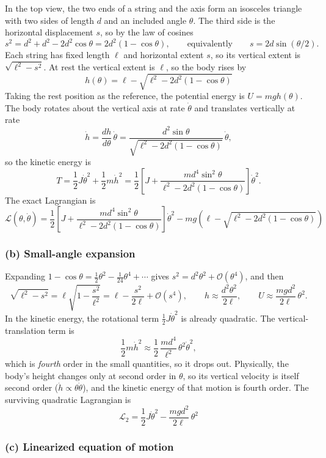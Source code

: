 \documentclass[11pt,letterpaper]{article}
\begin{document}
In the top view, the two ends of a string and the axis form an isosceles triangle with two sides of length $d$ and an included angle $\theta$. The third side is the horizontal displacement $s$, so by the law of cosines
\[
s^2 = d^2 + d^2 - 2d^2\cos\theta = 2d^2(1-\cos\theta),
\qquad\text{equivalently}\qquad
s = 2d\sin(\theta/2).
\]
Each string has fixed length $\ell$ and horizontal extent $s$, so its vertical extent is $\sqrt{\ell^2 - s^2}$. At rest the vertical extent is $\ell$, so the body rises by
\[
\boxed{h(\theta) = \ell - \sqrt{\ell^2 - 2d^2(1-\cos\theta)}}
\]
Taking the rest position as the reference, the potential energy is $U = mgh(\theta)$. The body rotates about the vertical axis at rate $\dot\theta$ and translates vertically at rate
\[
\dot h = \frac{dh}{d\theta}\,\dot\theta = \frac{d^2\sin\theta}{\sqrt{\ell^2 - 2d^2(1-\cos\theta)}}\,\dot\theta ,
\]
so the kinetic energy is
\[
T = \frac12 J\dot\theta^2 + \frac12 m\dot h^2
  = \frac12\left[J + \frac{m d^4\sin^2\theta}{\ell^2 - 2d^2(1-\cos\theta)}\right]\dot\theta^2 .
\]
The exact Lagrangian is
\[
\boxed{\mathcal{L}(\theta,\dot\theta) = \frac12\left[J + \frac{m d^4\sin^2\theta}{\ell^2 - 2d^2(1-\cos\theta)}\right]\dot\theta^2
 - mg\left(\ell - \sqrt{\ell^2 - 2d^2(1-\cos\theta)}\right)}
\]

\subsubsection*{(b) Small-angle expansion}

Expanding $1 - \cos\theta = \tfrac12\theta^2 - \tfrac1{24}\theta^4 + \cdots$ gives $s^2 = d^2\theta^2 + \mathcal{O}(\theta^4)$, and then
\[
\sqrt{\ell^2 - s^2} = \ell\sqrt{1 - \frac{s^2}{\ell^2}} = \ell - \frac{s^2}{2\ell} + \mathcal{O}(s^4),
\qquad
h \approx \frac{d^2\theta^2}{2\ell},
\qquad
U \approx \frac{mgd^2}{2\ell}\,\theta^2 .
\]
In the kinetic energy, the rotational term $\tfrac12 J\dot\theta^2$ is already quadratic. The vertical-translation term is
\[
\frac12 m\dot h^2 \approx \frac12\,\frac{m d^4}{\ell^2}\,\theta^2\dot\theta^2 ,
\]
which is \emph{fourth} order in the small quantities, so it drops out. Physically, the body's height changes only at second order in $\theta$, so its vertical velocity is itself second order ($\dot h \propto \theta\dot\theta$), and the kinetic energy of that motion is fourth order. The surviving quadratic Lagrangian is
\[
\boxed{\mathcal{L}_2 = \frac12 J\dot\theta^2 - \frac{mgd^2}{2\ell}\,\theta^2}
\]

\subsubsection*{(c) Linearized equation of motion}
\end{document}
